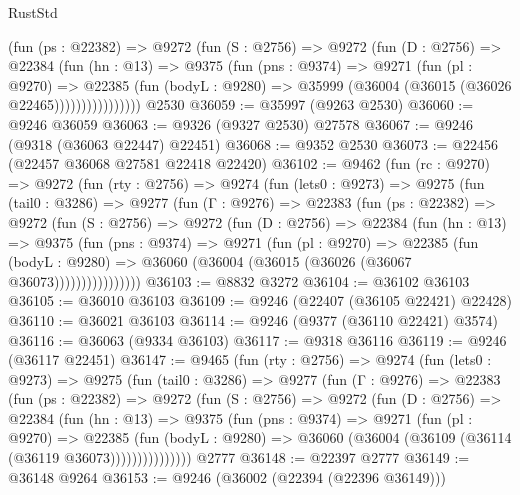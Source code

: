 \begin{lexlean}{RustStd}
\begin{coremodule}
                (fun (ps : @22382) =>
                @9272
                  (fun (S : @2756) =>
                  @9272
                    (fun (D : @2756) =>
                    @22384
                      (fun (hn : @13) =>
                      @9375
                        (fun (pns : @9374) =>
                        @9271
                          (fun (pl : @9270) =>
                          @22385
                            (fun (bodyL : @9280) =>
                            @35999 (@36004 (@36015 (@36026 @22465))))))))))))))))
    @2530
@36059 := @35997 (@9263 @2530)
@36060 := @9246 @36059
@36063 := @9326 (@9327 @2530) @27578
@36067 := @9246 (@9318 (@36063 @22447) @22451)
@36068 := @9352 @2530
@36073 := @22456 (@22457 @36068 @27581 @22418 @22420)
@36102 := @9462
    (fun (rc : @9270) =>
    @9272
      (fun (rty : @2756) =>
      @9274
        (fun (lets0 : @9273) =>
        @9275
          (fun (tail0 : @3286) =>
          @9277
            (fun (Γ : @9276) =>
            @22383
              (fun (ps : @22382) =>
              @9272
                (fun (S : @2756) =>
                @9272
                  (fun (D : @2756) =>
                  @22384
                    (fun (hn : @13) =>
                    @9375
                      (fun (pns : @9374) =>
                      @9271
                        (fun (pl : @9270) =>
                        @22385
                          (fun (bodyL : @9280) =>
                          @36060 (@36004 (@36015 (@36026 (@36067 @36073))))))))))))))))
@36103 := @8832 @3272
@36104 := @36102 @36103
@36105 := @36010 @36103
@36109 := @9246 (@22407 (@36105 @22421) @22428)
@36110 := @36021 @36103
@36114 := @9246 (@9377 (@36110 @22421) @3574)
@36116 := @36063 (@9334 @36103)
@36117 := @9318 @36116
@36119 := @9246 (@36117 @22451)
@36147 := @9465
    (fun (rty : @2756) =>
    @9274
      (fun (lets0 : @9273) =>
      @9275
        (fun (tail0 : @3286) =>
        @9277
          (fun (Γ : @9276) =>
          @22383
            (fun (ps : @22382) =>
            @9272
              (fun (S : @2756) =>
              @9272
                (fun (D : @2756) =>
                @22384
                  (fun (hn : @13) =>
                  @9375
                    (fun (pns : @9374) =>
                    @9271
                      (fun (pl : @9270) =>
                      @22385
                        (fun (bodyL : @9280) =>
                        @36060 (@36004 (@36109 (@36114 (@36119 @36073)))))))))))))))
    @2777
@36148 := @22397 @2777
@36149 := @36148 @9264
@36153 := @9246 (@36002 (@22394 (@22396 @36149)))

\end{coremodule}
\end{lexlean}
